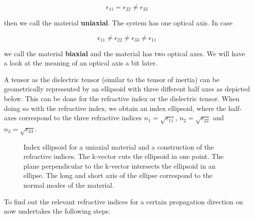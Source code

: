 \documentclass[
  a4paper,
]{book}
\begin{document}
\[
\epsilon_{11}=\epsilon_{22}\neq\epsilon_{33}
\]

then we call the material \textbf{uniaxial}. The system has one optical
axis. In case

\[
\epsilon_{11}\neq\epsilon_{22}\neq\epsilon_{33}\neq\epsilon_{11}
\]

we call the material \textbf{biaxial} and the material has two optical
axes. We will have a look at the meaning of an optical axis a bit later.

A tensor as the dielectric tensor (similar to the tensor of inertia) can
be geometrically represented by an ellipsoid with three different half
axes as depicted below. This can be done for the refractive index or the
dielectric tensor. When doing so with the refractive index, we obtain an
index ellipsoid, where the half-axes correspond to the three refractive
indices \(n_1=\sqrt{\epsilon_{11}}\), \(n_2=\sqrt{\epsilon_{22}}\) and
\(n_3=\sqrt{\epsilon_{33}}\).

\begin{figure}


\caption{\label{fig-index-tensor}Index ellipsoid for a uniaxial material
and a construction of the refractive indices. The k-vector cuts the
ellipsoid in one point. The plane perpendicular to the k-vector
intersects the ellipsoid in an ellipse. The long and short axis of the
ellipse correspond to the normal modes of the material.}

\end{figure}%

To find out the relevant refractive indices for a certain propagation
direction on now undertakes the following steps:
\end{document}
